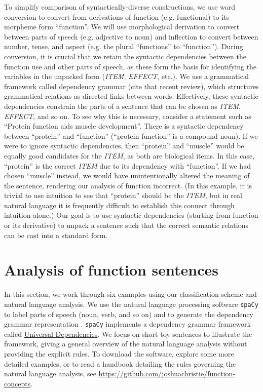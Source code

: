 \documentclass{article}
\begin{document}
To simplify comparison of syntactically-diverse constructions, we use word conversion to convert from derivations of function (e.g. functional) to its morpheme form ``function''.
We will use morphological derivation to convert between parts of speech (e.g. adjective to noun) and inflection to convert between number, tense, and aspect (e.g. the plural ``functions'' to ``function'').
During conversion, it is crucial that we retain the syntactic dependencies between the function use and other parts of speech, as these form the basis for identifying the variables in the unpacked form (\emph{ITEM}, \emph{EFFECT}, etc.).
We use a grammatical framework called dependency grammar (cite that recent review), which structures grammatical relations as directed links between words.
Effectively, these syntactic dependencies constrain the parts of a sentence that can be chosen as \emph{ITEM}, \emph{EFFECT}, and so on.
To see why this is necessary, consider a statement such as ``Protein function aids muscle development''.
There is a syntactic dependency between ``protein'' and ``function'' (``protein function'' is a compound noun).
If we were to ignore syntactic dependencies, then ``protein'' and ``muscle'' would be equally good candidates for the \emph{ITEM}, as both are biological items.
In this case, ``protein'' is the correct \emph{ITEM} due to its dependency with ``function''.
If we had chosen ``muscle'' instead, we would have unintentionally altered the meaning of the sentence, rendering our analysis of function incorrect.
(In this example, it is trivial to use intuition to see that ``protein'' should be the \emph{ITEM}, but in real natural language it is frequently difficult to establish this connect through intuition alone.)
Our goal is to use syntactic dependencies (starting from function or its derivative) to unpack a sentence such that the correct semantic relations can be cast into a standard form.

\section{Analysis of function sentences}
\label{sec:example-sentences}

In this section, we work through six examples using our classification scheme and natural language analysis.
We use the natural language processing software \texttt{spaCy} to label parts of speech (noun, verb, and so on) and to generate the dependency grammar representation \cite{spacy}.
\texttt{spaCy} implements a dependency grammar framework called \href{https://universaldependencies.org/#language-en}{Universal Dependencies}.
We focus on short toy sentences to illustrate the framework, giving a general overview of the natural language analysis without providing the explicit rules.
To download the software, explore some more detailed examples, or to read a handbook detailing the rules governing the natural language analysis, see
\newline
\href{https://github.com/joshuachristie/function-concepts}{https://github.com/joshuachristie/function-concepts}.
\end{document}
